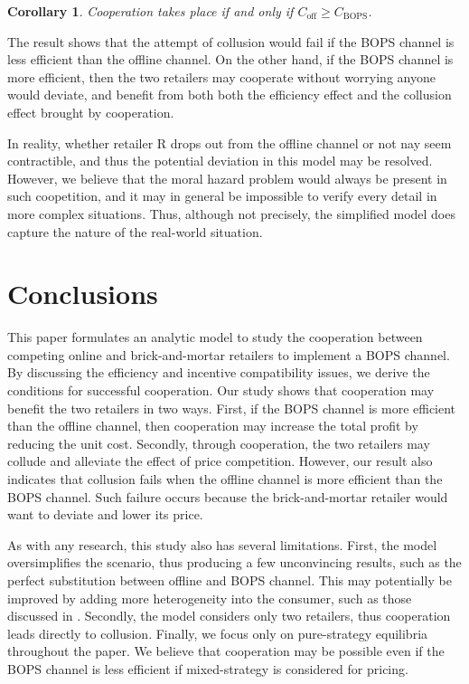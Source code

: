 \documentclass[a4paper]{article}
\theoremstyle{definition}
\theoremstyle{plain}
\newtheorem{corollary}{Corollary}
\theoremstyle{remark}
\newcommand{\off}{\mathrm{off}}
\newcommand{\BOPS}{\mathrm{BOPS}}
\begin{document}
\begin{corollary}\label{cor:coop}
    Cooperation takes place if and only if $C_{\off}\geq C_{\BOPS}$.
\end{corollary}

The result shows that the attempt of collusion would fail if the BOPS channel is less efficient than the offline channel.
On the other hand,
if the BOPS channel is more efficient,
then the two retailers may cooperate without worrying anyone would deviate,
and benefit from both both the efficiency effect and the collusion effect brought by cooperation.

In reality,
whether retailer R drops out from the offline channel or not nay seem contractible,
and thus the potential deviation in this model may be resolved.
However,
we believe that the moral hazard problem would always be present in such coopetition,
and it may in general be impossible to verify every detail in more complex situations.
Thus,
although not precisely,
the simplified model does capture the nature of the real-world situation.

\section{Conclusions}\label{sec:con}
This paper formulates an analytic model to study the cooperation between competing online and brick-and-mortar retailers to implement a BOPS channel.
By discussing the efficiency and incentive compatibility issues,
we derive the conditions for successful cooperation.
Our study shows that cooperation may benefit the two retailers in two ways.
First,
if the BOPS channel is more efficient than the offline channel,
then cooperation may increase the total profit by reducing the unit cost.
Secondly,
through cooperation,
the two retailers may collude and alleviate the effect of price competition.
However,
our result also indicates that collusion fails when the offline channel is more efficient than the BOPS channel.
Such failure occurs because the brick-and-mortar retailer would want to deviate and lower its price.

As with any research,
this study also has several limitations.
First,
the model oversimplifies the scenario,
thus producing a few unconvincing results,
such as the perfect substitution between offline and BOPS channel.
This may potentially be improved by adding more heterogeneity into the consumer,
such as those discussed in \cite{consumer}.
Secondly,
the model considers only two retailers,
thus cooperation leads directly to collusion.
Finally,
we focus only on pure-strategy equilibria throughout the paper.
We believe that cooperation may be possible even if the BOPS channel is less efficient if mixed-strategy is considered for pricing.
\end{document}

